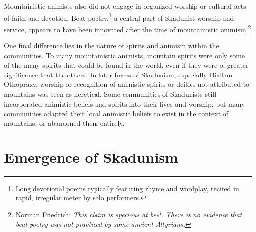 Mountainistic animists also did not engage in organized worship or cultural acts of faith and devotion. Beat poetry,\footnote{Long devotional poems typically featuring rhyme and wordplay, recited in rapid, irregular meter by solo performers.} a central part of Skadunist worship and service, appears to have been innovated after the time of mountainistic animism.\footnote{Norman Friedrich: \textit{This claim is specious at best. There is no evidence that beat poetry was not practiced by some ancient Altyrians.}}

One final difference lies in the nature of spirits and animism within the communities. To many mountainistic animists, mountain spirits were only some of the many spirits that could be found in the world, even if they were of greater significance that the others. In later forms of Skadunism, especially Bialkan Othopraxy, worship or recognition of animistic spirits or deities not attributed to mountains was seen as heretical. Some communities of Skadunists still incorporated animistic beliefs and spirits into their lives and worship, but many communities adapted their local animistic beliefs to exist in the context of mountains, or abandoned them entirely. \par 

\section{Emergence of Skadunism}
